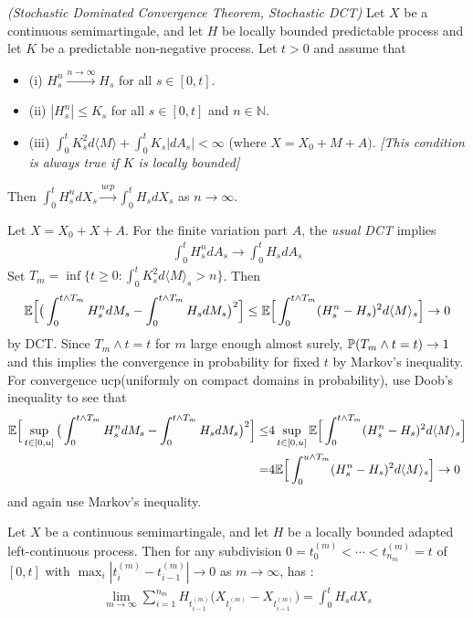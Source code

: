 \documentclass[12pt,a4paper]{article}
\newenvironment{proof}
{\begin{changemargin}{0.5cm}{0.5cm} 
	}%
	{\end{changemargin}
}
\renewenvironment{i}
{\begin{itemize} 
	}%
	{\end{itemize}
}
\newenvironment{p}
{\begin{proof} 
	}%
	{\end{proof}
}
\begin{document}
\prop \emph{(Stochastic Dominated Convergence Theorem, Stochastic DCT)} Let $X$ be a continuous semimartingale, and let $H$ be locally bounded predictable process and let $K$ be a predictable non-negative process. Let $t>0$ and assume that
\begin{i}
\item[(i)] $H_s^n \xrightarrow{n\rightarrow \infty} H_s$ for all $s\in [0,t]$.
\item[(ii)] $|H_s^n|\leq K_s$ for all $s\in [0, t]$ and $n\in \mathbb{N}$.
\item[(iii)] $\int_0^t K_s^2 d\langle M \rangle + \int_0^t K_s |dA_s| < \infty$ (where $X = X_0 + M +A)$. \emph{[This condition is always true if $K$ is locally bounded]}
\end{i}
Then $\int_0^t H_s^n dX_s \xrightarrow{ucp}\int_0^t H_s dX_s$ as $n\rightarrow \infty$.
\begin{p}
\pf Let $X= X_0 + X+A$. For the finite variation part $A$, the \emph{usual DCT} implies
\begin{align*}
\int_0^t H_s^n dA_s \rightarrow \int_0^t H_s dA_s
\end{align*}
Set $T_m = \inf \{t\geq 0 : \int_0^t K_s^2 d\langle M \rangle_s >n \}$. Then
\begin{align*}
\mathbb{E} \Big[ \big( \int_0^{t\wedge T_m} H_s^n dM_s - \int_0^{t\wedge T_m} H_s dM_s \big)^2 \Big] \leq \mathbb{E} \Big[ \int_0^{t\wedge T_m} (H_s^n - H_s)^2 d\langle M \rangle_s \Big] \rightarrow 0
\end{align*}
by DCT. Since $T_m \wedge t =t$ for $m$ large enough almost surely, $\mathbb{P} (T_m \wedge t =t) \rightarrow 1$ and this implies the convergence in probability for fixed $t$ by Markov's inequality. For convergence ucp(uniformly on compact domains in probability), use Doob's inequality to see that
\begin{align*}
\mathbb{E} \Big[ \sup_{t\in [0,u]} \big( \int_0^{t\wedge T_m} H_s^n dM_s - \int_0^{t\wedge T_m} H_s dM_s \big)^2 \Big] \leq &  4 \sup_{t\in [0,u]} \mathbb{E} \Big[ \int_0^{t\wedge T_m} (H_s^n - H_s)^2 d\langle M \rangle_s \Big] \\
=& 4 \mathbb{E} \Big[ \int_0^{u\wedge T_m} (H_s^n - H_s)^2 d\langle M \rangle_s \Big] \rightarrow 0
\end{align*}
and again use Markov's inequality.

\eop
\end{p}
\s

\corr Let $X$ be a continuous semimartingale, and let $H$ be a locally bounded adapted left-continuous process. Then for any subdivision $0 =t_0^{(m)} < \cdots < t_{n_m}^{(m)}=t$ of $[0,t]$ with $\max_i |t_i^{(m)} - t_{i-1}^{(m)}| \rightarrow 0$ as $m\rightarrow \infty$, has :
\begin{align*}
\lim_{m\rightarrow \infty} \sum_{i=1}^{n_m} H_{t_{i-1}^{(m)}} \big(X_{t_i^{(m)}} -X_{t_{i-1}^{(m)}} \big) = \int_0^t H_s dX_s
\end{align*}
\end{document}
